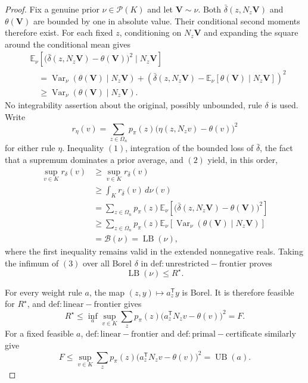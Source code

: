\documentclass{article}
\begin{document}
\begin{proof}
Fix a genuine prior \(\nu\in\mathcal P(K)\) and let \(\mathbf V\sim\nu\).  Both \(\bar\delta(z,N_z\mathbf V)\) and \(\theta(\mathbf V)\) are bounded by one in absolute value.  Their conditional second moments therefore exist.  For each fixed \(z\), conditioning on \(N_z\mathbf V\) and expanding the square around the conditional mean gives
\[
\begin{aligned}
 &\mathbb E_\nu\!\left[
 \bigl(\bar\delta(z,N_z\mathbf V)-\theta(\mathbf V)\bigr)^2
 \mid N_z\mathbf V\right]\\
 &\quad=
 \operatorname{Var}_\nu\!\left(\theta(\mathbf V)\mid N_z\mathbf V\right)
 +\left(
 \bar\delta(z,N_z\mathbf V)
 -\mathbb E_\nu[\theta(\mathbf V)\mid N_z\mathbf V]
 \right)^2\\
 &\quad\ge
 \operatorname{Var}_\nu\!\left(\theta(\mathbf V)\mid N_z\mathbf V\right).
\end{aligned}                                                                     \tag{2}
\]
No integrability assertion about the original, possibly unbounded, rule \(\delta\) is used.  Write
\[
 r_\eta(v)=\sum_{z\in\Omega_n}p_\pi(z)
 \bigl(\eta(z,N_zv)-\theta(v)\bigr)^2
\]
for either rule \(\eta\).  Inequality \((1)\), integration of the bounded loss of \(\bar\delta\), the fact that a supremum dominates a prior average, and \((2)\) yield, in this order,
\[
\begin{aligned}
 \sup_{v\in K}r_\delta(v)
 &\ge \sup_{v\in K}r_{\bar\delta}(v)\\
 &\ge \int_K r_{\bar\delta}(v)\,d\nu(v)\\
 &=\sum_{z\in\Omega_n}p_\pi(z)
 \mathbb E_\nu\!\left[
 \bigl(\bar\delta(z,N_z\mathbf V)-\theta(\mathbf V)\bigr)^2\right]\\
 &\ge \sum_{z\in\Omega_n}p_\pi(z)
 \mathbb E_\nu\!\left[
 \operatorname{Var}_\nu(\theta(\mathbf V)\mid N_z\mathbf V)\right]\\
 &=\mathcal B(\nu)=\operatorname{LB}(\nu),
\end{aligned}                                                                     \tag{3}
\]
where the first inequality remains valid in the extended nonnegative reals.  Taking the infimum of \((3)\) over all Borel \(\delta\) in \(\mathrm{def:unrestricted-frontier}\) proves
\[
 \operatorname{LB}(\nu)\le R^{\star}.                                           \tag{4}
\]

For every weight rule \(a\), the map \((z,y)\mapsto a_z^{\mathsf T}y\) is Borel.  It is therefore feasible for \(R^{\star}\), and \(\mathrm{def:linear-frontier}\) gives
\[
 R^{\star}
 \le \inf_a\sup_{v\in K}\sum_zp_\pi(z)
 \bigl(a_z^{\mathsf T}N_zv-\theta(v)\bigr)^2
 =F.                                                                              \tag{5}
\]
For a fixed feasible \(a\), \(\mathrm{def:linear-frontier}\) and \(\mathrm{def:primal-certificate}\) similarly give
\[
 F\le
 \sup_{v\in K}\sum_zp_\pi(z)
 \bigl(a_z^{\mathsf T}N_zv-\theta(v)\bigr)^2
 =\operatorname{UB}(a).                                                           \tag{6}
\]


\end{proof}
\end{document}
